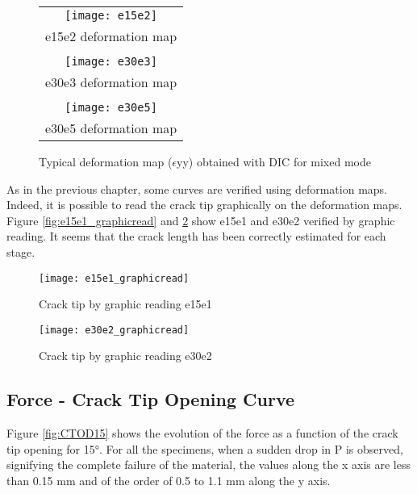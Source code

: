 \begin{figure}[htp]
	\centering
	\begin{tabular}{c}
		\texttt{[image: e15e2]} \\
		e15e2 deformation map \\
		\\
		\texttt{[image: e30e3]} \\
		e30e3 deformation map \\
		\\
		\texttt{[image: e30e5]} \\
		e30e5 deformation map \\
	\end{tabular}
	\caption{Typical deformation map ($\epsilon$yy) obtained with DIC for mixed mode}
	\label{fig:Strain_def_mixedmode}
\end{figure}

As in the previous chapter, some curves are verified using deformation maps. Indeed, it is possible to read the crack tip graphically  on the deformation maps. Figure \ref{fig:e15e1_graphicread} and \ref{fig:e30e2_graphicread} show e15e1 and e30e2 verified by graphic reading. It seems that the crack length has been correctly estimated for each stage.

\begin{figure}[htp]
	\begin{minipage}[c]{.46\linewidth}
		\centering
		\texttt{[image: e15e1\_graphicread]}
		\caption{Crack tip by graphic reading e15e1}
		\label{fig:e15e1_graphicread}
	\end{minipage}
	\hfill%
	\begin{minipage}[c]{.46\linewidth}
		\centering
		\texttt{[image: e30e2\_graphicread]}
		\caption{Crack tip by graphic reading e30e2 }
		\label{fig:e30e2_graphicread}
	\end{minipage}
\end{figure}

\subsection{Force - Crack Tip Opening Curve}

Figure \ref{fig:CTOD15} shows the evolution of the force as a function of the crack tip opening for 15°. For all the specimens, when a sudden drop in P is observed, signifying the complete failure of the material, the values along the x axis are less than 0.15 mm and of the order of 0.5 to 1.1 mm along the y axis.

